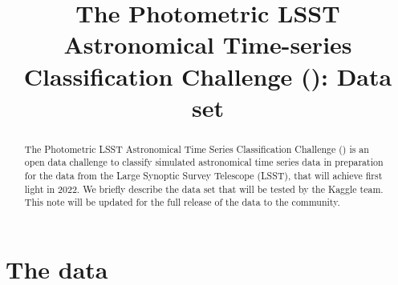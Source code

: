 \documentclass[iop,twocolumn]{emulateapj}
\newcommand{\<}      {\langle}
\renewcommand{\>}    {\rangle}
\begin{document}
\title{The Photometric LSST Astronomical Time-series Classification Challenge ({\plasticc}): Data set}


\begin{abstract}
The Photometric LSST Astronomical Time Series Classification Challenge ({\plasticc}) is an open data challenge to classify simulated astronomical time series data in preparation for the data from the Large Synoptic Survey Telescope (LSST), that will achieve first light in 2022. We briefly describe the {\plasticc} data set that will be tested by the Kaggle team. This note will be updated for the full release of the data to the community.

\end{abstract}


\maketitlepost


\section{The data}
\label{sec:thedata}
\end{document}
